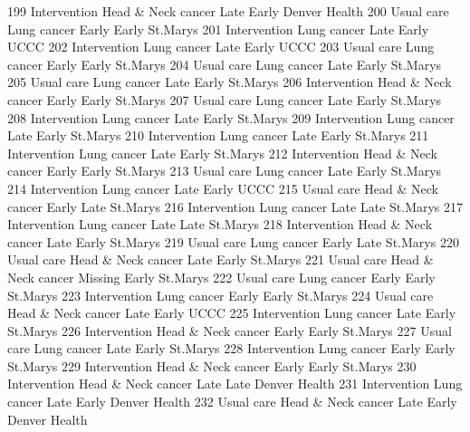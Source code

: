 \documentclass[
  letterpaper,
  DIV=11,
  numbers=noendperiod]{scrreprt}
\newenvironment{Shaded}{\begin{snugshade}}{\end{snugshade}}
\newcommand{\NormalTok}[1]{\textcolor[rgb]{0.00,0.23,0.31}{#1}}
\begin{document}
\begin{Shaded}
\begin{Highlighting}[]
\NormalTok{199 Intervention Head \& Neck cancer    Late Early   Denver Health}
\NormalTok{200   Usual care        Lung cancer   Early Early        St.Marys}
\NormalTok{201 Intervention        Lung cancer    Late Early            UCCC}
\NormalTok{202 Intervention        Lung cancer    Late Early            UCCC}
\NormalTok{203   Usual care        Lung cancer   Early Early        St.Marys}
\NormalTok{204   Usual care        Lung cancer    Late Early        St.Marys}
\NormalTok{205   Usual care        Lung cancer    Late Early        St.Marys}
\NormalTok{206 Intervention Head \& Neck cancer   Early Early        St.Marys}
\NormalTok{207   Usual care        Lung cancer    Late Early        St.Marys}
\NormalTok{208 Intervention        Lung cancer    Late Early        St.Marys}
\NormalTok{209 Intervention        Lung cancer    Late Early        St.Marys}
\NormalTok{210 Intervention        Lung cancer    Late Early        St.Marys}
\NormalTok{211 Intervention        Lung cancer    Late Early        St.Marys}
\NormalTok{212 Intervention Head \& Neck cancer   Early Early        St.Marys}
\NormalTok{213   Usual care        Lung cancer    Late Early        St.Marys}
\NormalTok{214 Intervention        Lung cancer    Late Early            UCCC}
\NormalTok{215   Usual care Head \& Neck cancer   Early  Late        St.Marys}
\NormalTok{216 Intervention        Lung cancer    Late  Late        St.Marys}
\NormalTok{217 Intervention        Lung cancer    Late  Late        St.Marys}
\NormalTok{218 Intervention Head \& Neck cancer    Late Early        St.Marys}
\NormalTok{219   Usual care        Lung cancer   Early  Late        St.Marys}
\NormalTok{220   Usual care Head \& Neck cancer    Late Early        St.Marys}
\NormalTok{221   Usual care Head \& Neck cancer Missing Early        St.Marys}
\NormalTok{222   Usual care        Lung cancer   Early Early        St.Marys}
\NormalTok{223 Intervention        Lung cancer   Early Early        St.Marys}
\NormalTok{224   Usual care Head \& Neck cancer    Late Early            UCCC}
\NormalTok{225 Intervention        Lung cancer    Late Early        St.Marys}
\NormalTok{226 Intervention Head \& Neck cancer   Early Early        St.Marys}
\NormalTok{227   Usual care        Lung cancer    Late Early        St.Marys}
\NormalTok{228 Intervention        Lung cancer   Early Early        St.Marys}
\NormalTok{229 Intervention Head \& Neck cancer   Early Early        St.Marys}
\NormalTok{230 Intervention Head \& Neck cancer    Late  Late   Denver Health}
\NormalTok{231 Intervention        Lung cancer    Late Early   Denver Health}
\NormalTok{232   Usual care Head \& Neck cancer    Late Early   Denver Health}

\end{Highlighting}
\end{Shaded}
\end{document}

